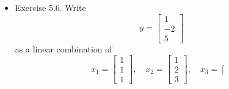 \documentclass{article}
\begin{document}
\begin{itemize}
\begin{itemize}
\[\begin{array}{c}
            1 \\ 2 \\ 1 \\ 0 \\ 0
        \end{array} \right] + \alpha_2 \left[ \begin{array}{c}
            1 \\ 1 \\ 0 \\ 1 \\ 1
        \end{array} \right] + \alpha_3 \left[ \begin{array}{c}
            1 \\ 0 \\ 0 \\ 1 \\ 1
        \end{array} \right] = \left[ \begin{array}{c}
            0 \\ 0 \\ 0 \\ 0 \\ 0
        \end{array} \right]
        \]
        \item Notice from third row that $\alpha_1 = 0$
        \item Use this in the second row to immediately get $\alpha_2 = 0$
        \item From the final row, we get that $\alpha_3 = 0$
        \item Therefore, the vectors must be linearly independent.
    \end{itemize}
    \item Exercise 5.6. Write
    \[
    y = \left[ \begin{array}{c}
            1 \\ -2 \\ 5
        \end{array} \right]
    \]
    as a linear combination of
    \[
    x_1 = \left[ \begin{array}{c}
        1 \\ 1 \\ 1
    \end{array} \right], \quad x_2 = \left[ \begin{array}{c}
        1 \\ 2 \\ 3
    \end{array} \right], \quad x_3 = \left[ \begin{array}{c}

\end{array}\]
\end{itemize}
\end{document}
